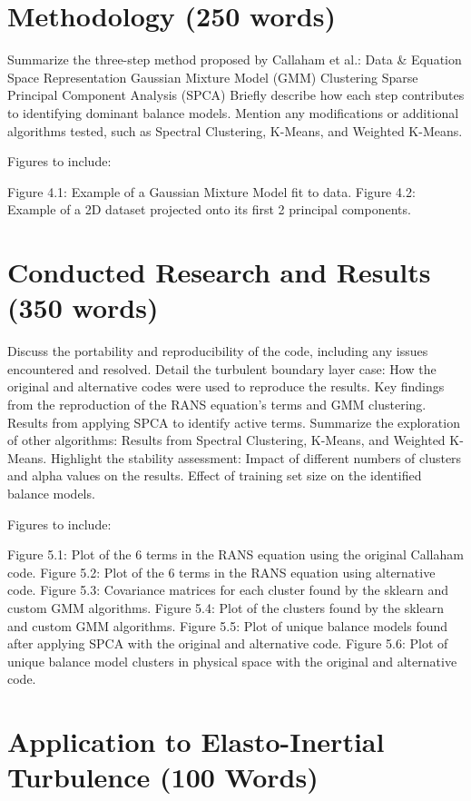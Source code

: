 \documentclass[12pt]{report} %
\begin{document}
\section{Methodology (250 words)}

Summarize the three-step method proposed by Callaham et al.:
Data \& Equation Space Representation
Gaussian Mixture Model (GMM) Clustering
Sparse Principal Component Analysis (SPCA)
Briefly describe how each step contributes to identifying dominant balance models.
Mention any modifications or additional algorithms tested, such as Spectral Clustering, K-Means, and Weighted K-Means.

Figures to include:

Figure 4.1: Example of a Gaussian Mixture Model fit to data.
Figure 4.2: Example of a 2D dataset projected onto its first 2 principal components.


\section{Conducted Research and Results (350 words)}

Discuss the portability and reproducibility of the code, including any issues encountered and resolved.
Detail the turbulent boundary layer case:
How the original and alternative codes were used to reproduce the results.
Key findings from the reproduction of the RANS equation’s terms and GMM clustering.
Results from applying SPCA to identify active terms.
Summarize the exploration of other algorithms:
Results from Spectral Clustering, K-Means, and Weighted K-Means.
Highlight the stability assessment:
Impact of different numbers of clusters and alpha values on the results.
Effect of training set size on the identified balance models.

Figures to include:

Figure 5.1: Plot of the 6 terms in the RANS equation using the original Callaham code.
Figure 5.2: Plot of the 6 terms in the RANS equation using alternative code.
Figure 5.3: Covariance matrices for each cluster found by the sklearn and custom GMM algorithms.
Figure 5.4: Plot of the clusters found by the sklearn and custom GMM algorithms.
Figure 5.5: Plot of unique balance models found after applying SPCA with the original and alternative code.
Figure 5.6: Plot of unique balance model clusters in physical space with the original and alternative code.


\section{Application to Elasto-Inertial Turbulence (100 Words)}
\end{document}
